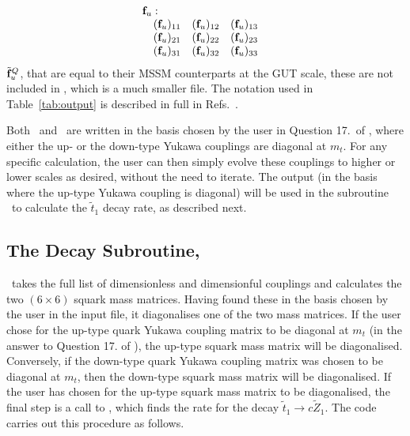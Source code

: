 \begin{eqnarray*}
&\begin{array}{cccc}\multicolumn{2}{l}{{\mathbf{f}}_u:}\\&({\mathbf{f}}_u)_{11}&({\mathbf{f}}_u)_{12}&({\mathbf{f}}_u)_{13}\\&({\mathbf{f}}_u)_{21}&({\mathbf{f}}_u)_{22}&({\mathbf{f}}_u)_{23}\\&({\mathbf{f}}_u)_{31}&({\mathbf{f}}_u)_{32}&({\mathbf{f}}_u)_{33}\end{array}
\end{eqnarray*} %
$\tilde{\mathbf{f}}^Q_u$, that are equal to their MSSM counterparts at the GUT scale,
these are not included in \gout, which is a much smaller file. The
notation used in Table~\ref{tab:output} is described in full in
Refs.~\cite{RGE1,RGE2}.

Both \wout~and \gout~are written in the basis chosen by the user in
Question 17.~of \inrge, where either the up- or the down-type Yukawa
couplings are diagonal at $m_{t}$. For any specific calculation, the
user can then simply evolve these couplings to higher or lower scales as
desired, without the need to iterate. The output (in the basis where the
up-type Yukawa coupling is diagonal) will be used in the subroutine
\progstd~to calculate the $\tilde{t}_{1}$ decay rate, as described next.


\subsection{The Decay Subroutine, \progstd}\label{sec:std}

\progstd~takes the full list of dimensionless and dimensionful couplings
and calculates the two $(6\times6)$ squark mass matrices. Having found
these in the basis chosen by the user in the input file, it diagonalises
one of the two mass matrices. If the user chose for the up-type quark
Yukawa coupling matrix to be diagonal at $m_t$ (in the answer to
Question 17. of \inrge), the up-type squark mass matrix will be
diagonalised. Conversely, if the down-type quark Yukawa coupling matrix
was chosen to be diagonal at $m_t$, then the down-type squark mass
matrix will be diagonalised. If the user has chosen for the up-type
squark mass matrix to be diagonalised, the final step is a call to
\progstone, which finds the rate for the decay $\tilde{t}_{1}\rightarrow
c\tilde{Z}_1$. The code carries out this procedure as follows.

